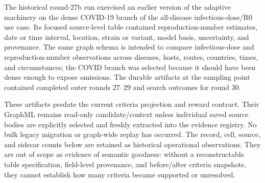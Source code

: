 \documentclass[11pt]{article}
\begin{document}
The historical round-27b run exercised an earlier version of the adaptive
machinery on the dense COVID-19 branch of the all-disease infectious-dose/R0
use case.  Its focused source-level table contained reproduction-number
estimates, date or time interval, location, strain or variant, model basis,
uncertainty, and provenance.  The same graph schema is intended to compare
infectious-dose and reproduction-number observations across diseases, hosts,
routes, countries, times, and circumstances; the COVID branch was selected
because it should have been dense enough to expose omissions.  The durable
artifacts at the sampling point contained completed outer rounds 27--29 and
search outcomes for round 30.

These artifacts predate the current criteria projection and reward contract.
Their GraphML remains read-only candidate/context unless individual saved
source bodies are explicitly selected and freshly extracted into the evidence
registry.  No bulk legacy migration or graph-wide replay has occurred.
The record, cell, source, and sidecar counts below are retained as historical
operational observations.  They are out of scope as evidence of semantic
goodness: without a reconstructable table specification, field-level
provenance, and before/after criteria snapshots, they cannot establish how many
criteria became supported or unresolved.
\end{document}
